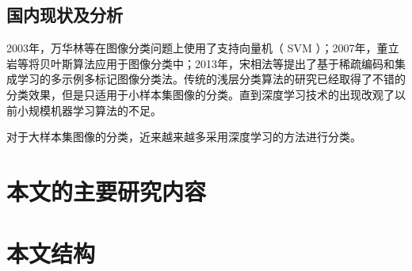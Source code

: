 		\subsection{国内现状及分析}
	
			2003年，万华林等在图像分类问题上使用了支持向量机（ SVM ）；2007年，董立岩等将贝叶斯算法应用于图像分类中；2013年，宋相法等提出了基于稀疏编码和集成学习的多示例多标记图像分类法。传统的浅层分类算法的研究已经取得了不错的分类效果，但是只适用于小样本集图像的分类。直到深度学习技术的出现改观了以前小规模机器学习算法的不足。
		
			对于大样本集图像的分类，近来越来越多采用深度学习的方法进行分类。
	
	\section{本文的主要研究内容}
	
		
		
			
	\section{本文结构}
	

